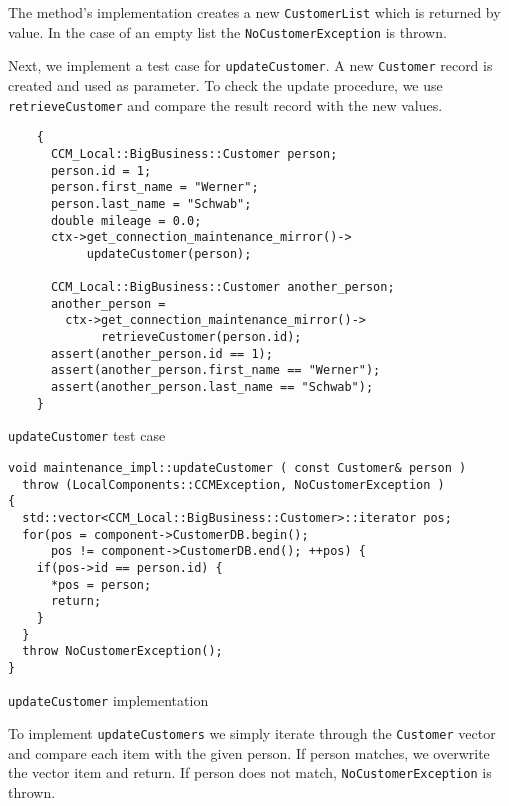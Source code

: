 The method's implementation creates a new {\tt CustomerList} which
is returned by value.
In the case of an empty list the {\tt NoCustomerException} is thrown.


Next, we implement a test case for {\tt updateCustomer}.
A new {\tt Customer} record is created and used as parameter.
To check the update procedure, we use {\tt retrieveCustomer} 
and compare the result record with the new values.
\begin{Example}
\begin{minifbox}
\begin{small}
\begin{verbatim}
    {
      CCM_Local::BigBusiness::Customer person;
      person.id = 1;
      person.first_name = "Werner";
      person.last_name = "Schwab";
      double mileage = 0.0;
      ctx->get_connection_maintenance_mirror()->
           updateCustomer(person);      

      CCM_Local::BigBusiness::Customer another_person;
      another_person = 
        ctx->get_connection_maintenance_mirror()->
             retrieveCustomer(person.id);
      assert(another_person.id == 1);
      assert(another_person.first_name == "Werner");
      assert(another_person.last_name == "Schwab");
    }
\end{verbatim}
\end{small}
\end{minifbox}
\caption{{\tt updateCustomer} test case}
\label{example:}
\end{Example}


\begin{Example}
\begin{minifbox}
\begin{small}
\begin{verbatim}
void maintenance_impl::updateCustomer ( const Customer& person )
  throw (LocalComponents::CCMException, NoCustomerException )
{
  std::vector<CCM_Local::BigBusiness::Customer>::iterator pos;
  for(pos = component->CustomerDB.begin(); 
      pos != component->CustomerDB.end(); ++pos) {
    if(pos->id == person.id) {
      *pos = person;
      return;
    }
  }
  throw NoCustomerException();  
}
\end{verbatim}
\end{small}
\end{minifbox}
\caption{{\tt updateCustomer} implementation}
\label{example:}
\end{Example}

To implement {\tt updateCustomers} we simply iterate through the {\tt Customer}
vector and compare each item with the given person.
If person matches, we overwrite the vector item and return.
If person does not match, {\tt NoCustomerException} is thrown.


